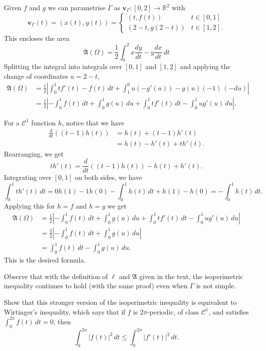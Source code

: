 \documentclass[12 pt, letterpaper]{hmcpset}
\begin{document}
\begin{solution}
	Given $f$ and $g$ we can parametrise $\Gamma$ as $\mathbf{v}_{\Gamma} : [0, 2] \to \mathbb{R}^{2}$ with
	\[
		\mathbf{v}_{\Gamma}(t) = (x(t), y(t)) = \begin{cases}
			(t, f(t)) & t \in [0, 1] \\
			(2 - t, g(2 - t)) & t \in [1, 2].
		\end{cases}
	\]
	This encloses the area
	\[
		\mathfrak{A}(\Omega) = \frac{1}{2} \int_{0}^{2} x \frac{dy}{dt} - y \frac{dx}{dt} \, dt
	\]
	Splitting the integral into integrals over $[0, 1]$ and $[1, 2]$ and applying the change of coordinates $u = 2 - t$,
	\begin{align*}
		\mathfrak{A}(\Omega) & = \frac{1}{2} \left \lvert \int_{0}^{1} t f'(t) - f(t) \, dt + \int_{1}^{0} u (-g'(u)) - g(u) (-1) \, (-du)  \right \rvert \\
				     & = \frac{1}{2} \left \lvert - \int_{0}^{1} f(t) \, dt + \int_{0}^{1} g(u) \, du + \int_{0}^{1} t f'(t) \, dt - \int_{0}^{1} u g'(u) \, du \right \rvert.
	\end{align*}

	For a $\mathcal{C}^{1}$ function $h$, notice that we have
	\begin{align*}
		\frac{d }{d t} ((t - 1) h(t)) & = h(t) + (t - 1) h'(t) \\
					      & = h(t) - h'(t) + t h'(t).
	\end{align*}
	Rearranging, we get
	\[
		t h'(t) = \frac{d }{d t} ((t - 1) h(t)) - h(t) + h'(t).
	\]
	Integrating over $[0, 1]$ on both sides, we have
	\[
		\int_{0}^{1} t h'(t) \, dt = 0 h(1) - 1 h(0) - \int_{0}^{1} h(t) \, dt + h(1) - h(0) = - \int_{0}^{1} h(t) \, dt.
	\]
	Applying this for $h = f$ and $h = g$ we get
	\begin{align*}
		\mathfrak{A}(\Omega) & = \frac{1}{2} \left \lvert - \int_{0}^{1} f(t) \, dt + \int_{0}^{1} g(u) \, du + \int_{0}^{1} t f'(t) \, dt - \int_{0}^{1} u g'(u) \, du \right \rvert \\
				     & = \frac{2}{2} \left \lvert - \int_{0}^{1} f(t) \, dt + \int_{0}^{1} g(u) \, du \right \rvert \\
				     & = \int_{0}^{1} f(t) \, dt - \int_{0}^{1} g(u) \, du.
	\end{align*}
	This is the desired formula.
\end{solution}

\pagebreak

\begin{problem}[S \& S \S 4.5 \#4.]
	Observe that with the definition of $\ell$ and $\mathfrak{A}$ given in the text, the isoperimetric inequality continues to hold (with the same proof) even when $\Gamma$ is not simple.

	Show that this stronger version of the isoperimetric inequality is equivalent to Wirtinger's inequality, which says that if $f$ is $2 \pi$-periodic, of class $\mathcal{C}^{1}$, and satisfies  $\int_{0}^{2 \pi} f(t) \, dt = 0$, then
	\[
		\int_{0}^{2 \pi} \lvert f(t) \rvert^{2} \, dt \le \int_{0}^{2 \pi} \lvert f'(t) \rvert^{2} \, dt.
	\]
\end{problem}
\end{document}
